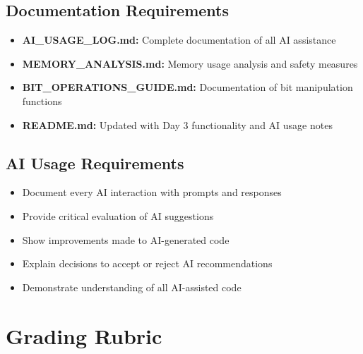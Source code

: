 \documentclass[11pt,a4paper]{article}
\begin{document}
\subsection{Documentation Requirements}
\begin{itemize}
    \item \textbf{AI\_USAGE\_LOG.md:} Complete documentation of all AI assistance
    \item \textbf{MEMORY\_ANALYSIS.md:} Memory usage analysis and safety measures
    \item \textbf{BIT\_OPERATIONS\_GUIDE.md:} Documentation of bit manipulation functions
    \item \textbf{README.md:} Updated with Day 3 functionality and AI usage notes
\end{itemize}

\subsection{AI Usage Requirements}
\begin{itemize}
    \item Document every AI interaction with prompts and responses
    \item Provide critical evaluation of AI suggestions
    \item Show improvements made to AI-generated code
    \item Explain decisions to accept or reject AI recommendations
    \item Demonstrate understanding of all AI-assisted code
\end{itemize}

\section{Grading Rubric}
\end{document}
